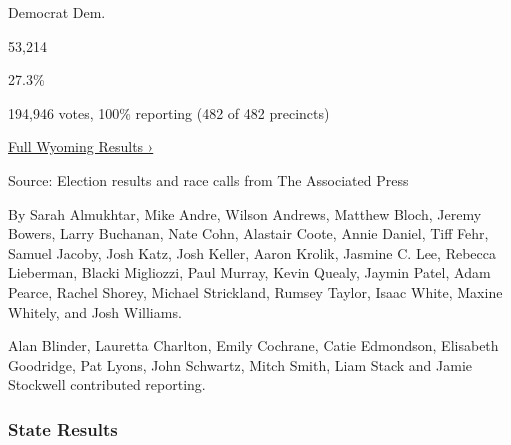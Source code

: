 Democrat Dem.

53,214

27.3\%

194,946 votes, 100\% reporting (482 of 482 precincts)

\href{https://www.nytimes3xbfgragh.onion/interactive/2018/11/06/us/elections/results-wyoming-elections.html}{Full
Wyoming Results ›}

Source: Election results and race calls from The Associated Press

By Sarah Almukhtar, Mike Andre, Wilson Andrews, Matthew Bloch, Jeremy
Bowers, Larry Buchanan, Nate Cohn, Alastair Coote, Annie Daniel, Tiff
Fehr, Samuel Jacoby, Josh Katz, Josh Keller, Aaron Krolik, Jasmine C.
Lee, Rebecca Lieberman, Blacki Migliozzi, Paul Murray, Kevin Quealy,
Jaymin Patel, Adam Pearce, Rachel Shorey, Michael Strickland, Rumsey
Taylor, Isaac White, Maxine Whitely, and Josh Williams.

Alan Blinder, Lauretta Charlton, Emily Cochrane, Catie Edmondson,
Elisabeth Goodridge, Pat Lyons, John Schwartz, Mitch Smith, Liam Stack
and Jamie Stockwell contributed reporting.

\hypertarget{state-results}{%
\subsubsection{State Results}\label{state-results}}

